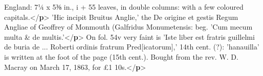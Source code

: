 \begin{shaded}
\hspace*{1em}\hspace*{1em} England: 7¼ x 5⅜ in., i + 55 leaves, in double columns: with a few coloured\mbox{}\newline 
\hspace*{1em}\hspace*{1em} capitals.{</\textbf{p}>}\mbox{}\newline 
{}'Hic incipit Bruitus Anglie,' the De origine et gestis Regum Angliae of\mbox{}\newline 
\hspace*{1em}\hspace*{1em} Geoffrey of Monmouth (Galfridus Monumetensis: beg. 'Cum mecum multa \& de\mbox{}\newline 
\hspace*{1em}\hspace*{1em} multis.'{</\textbf{p}>}\mbox{}\newline 
{}On fol. 54v very faint is 'Iste liber est fratris guillelmi de buria de ...\mbox{}\newline 
\hspace*{1em}\hspace*{1em} Roberti ordinis fratrum Pred[icatorum],' 14th cent. (?): 'hanauilla' is written\mbox{}\newline 
\hspace*{1em}\hspace*{1em} at the foot of the page (15th cent.). Bought from the rev. W. D. Macray on March\mbox{}\newline 
\hspace*{1em}\hspace*{1em} 17, 1863, for £1 10s.{</\textbf{p}>}\mbox{}\newline 

\end{shaded}
